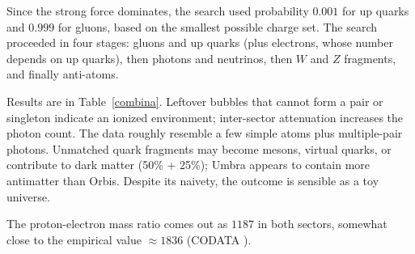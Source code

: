 \documentclass{ijuc}
\begin{document}
Since the strong force dominates, the search used probability $0.001$ for up quarks and $0.999$ for gluons, based on the smallest possible charge set. The search proceeded in four stages: gluons and up quarks (plus electrons, whose number depends on up quarks), then photons and neutrinos, then $W$ and $Z$ fragments, and finally anti-atoms.

Results are in Table~\ref{combina}. Leftover bubbles that cannot form a pair or singleton indicate an ionized environment; inter-sector attenuation increases the photon count. The data roughly resemble a few simple atoms plus multiple-pair photons. Unmatched quark fragments may become mesons, virtual quarks, or contribute to dark matter (50\% + 25\%); Umbra appears to contain more antimatter than Orbis. Despite its naivety, the outcome is sensible as a toy universe.

The proton-electron mass ratio comes out as $1187$ in both sectors, somewhat close to the empirical value $\approx1836$ (CODATA \cite{codata}). 
\end{document}
